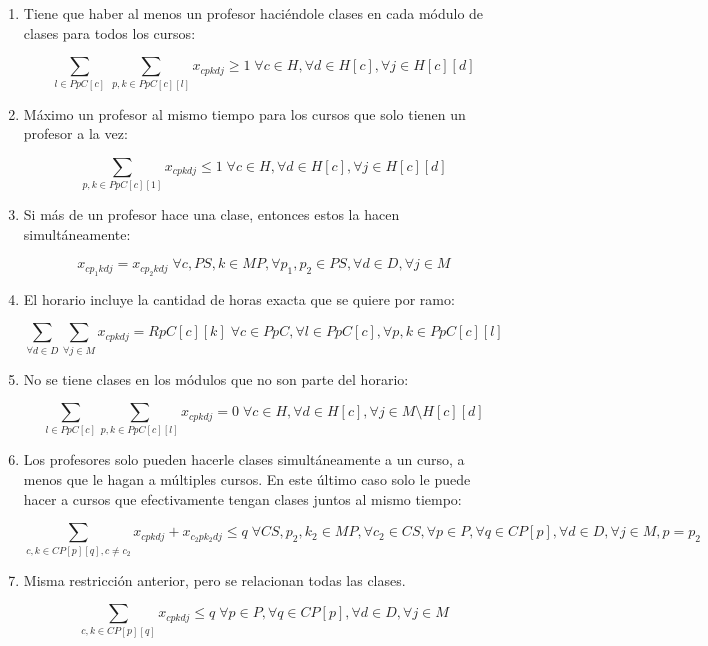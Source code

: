 \documentclass[letterpaper]{article}
\begin{document}
\begin{enumerate}
    \item Tiene que haber al menos un profesor haciéndole clases en cada módulo de clases para todos los cursos:
    
    $$\sum_{l \in PpC[c]} \, \sum_{p,k \in PpC[c][l]} x_{cpkdj} \geq 1 \; \forall c \in H, \forall d \in H[c], \forall j \in H[c][d]$$

    \item Máximo un profesor al mismo tiempo para los cursos que solo tienen un profesor a la vez:

    $$\sum_{p,k \in PpC[c][1]} x_{cpkdj} \leq 1 \; \forall c \in H, \forall d \in H[c], \forall j \in H[c][d]$$

    \item Si más de un profesor hace una clase, entonces estos la hacen simultáneamente:
    
    $$x_{cp_1kdj} = x_{cp_2kdj} \; \forall c,PS,k \in MP, \forall p_1,p_2 \in PS, \forall d \in D, \forall j \in M$$

    \item El horario incluye la cantidad de horas exacta que se quiere por ramo:
    
    $$\sum_{\forall d \in D} \sum_{\forall j \in M} x_{cpkdj} = RpC[c][k] \; \forall c \in PpC, \forall l \in PpC[c], \forall p,k \in PpC[c][l]$$

    \item No se tiene clases en los módulos que no son parte del horario:

    $$\sum_{l \in PpC[c]} \sum_{p,k \in PpC[c][l]} x_{cpkdj} = 0 \; \forall c \in H, \forall d \in H[c], \forall j \in M \setminus H[c][d]$$

    \item Los profesores solo pueden hacerle clases simultáneamente a un curso, a menos que le hagan a múltiples cursos. En este último caso solo le puede hacer a cursos que efectivamente tengan clases juntos al mismo tiempo:

    $$\sum_{c,k \in CP[p][q], c \neq c_2} x_{cpkdj} + x_{c_2pk_2dj} \leq q \; \forall CS,p_2,k_2 \in MP, \forall c_2 \in CS, \forall p \in P, \forall q \in CP[p], \forall d \in D, \forall j \in M, p = p_2$$

    \item Misma restricción anterior, pero se relacionan todas las clases.
    
    $$\sum_{c,k \in CP[p][q]} x_{cpkdj} \leq q \; \forall p \in P, \forall q \in CP[p], \forall d \in D, \forall j \in M$$


\end{enumerate}
\end{document}
